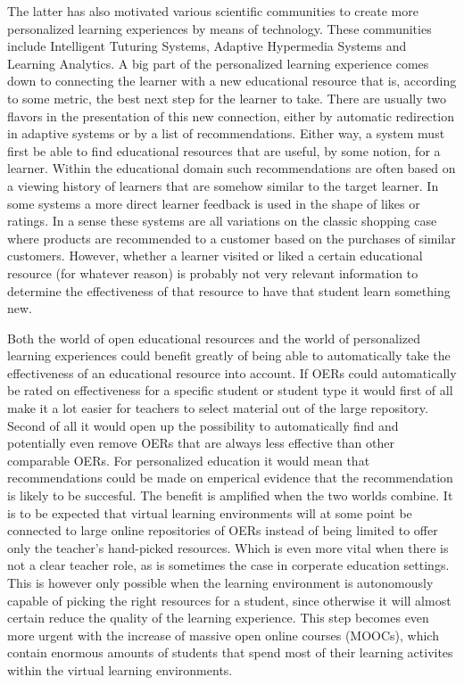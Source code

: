 The latter has also motivated various scientific communities to create more personalized learning experiences by means of technology. These communities include Intelligent Tuturing Systems, Adaptive Hypermedia Systems and Learning Analytics. A big part of the personalized learning experience comes down to connecting the learner with a new educational resource that is, according to some metric, the best next step for the learner to take. There are usually two flavors in the presentation of this new connection, either by automatic redirection in adaptive systems or by a list of recommendations. Either way, a system must first be able to find educational resources that are useful, by some notion, for a learner. Within the educational domain such recommendations are often based on a viewing history of learners that are somehow similar to the target learner. In some systems a more direct learner feedback is used in the shape of likes or ratings. In a sense these systems are all variations on the classic shopping case where products are recommended to a customer based on the purchases of similar customers. However, whether a learner visited or liked a certain educational resource (for whatever reason) is probably not very relevant information to determine the effectiveness of that resource to have that student learn something new.

Both the world of open educational resources and the world of personalized learning experiences could benefit greatly of being able to automatically take the effectiveness of an educational resource into account. If OERs could automatically be rated on effectiveness for a specific student or student type it would first of all make it a lot easier for teachers to select material out of the large repository. Second of all it would open up the possibility to automatically find and potentially even remove OERs that are always less effective than other comparable OERs. For personalized education it would mean that recommendations could be made on emperical evidence that the recommendation is likely to be succesful. The benefit is amplified when the two worlds combine. It is to be expected that virtual learning environments will at some point be connected to large online repositories of OERs instead of being limited to offer only the teacher’s hand-picked resources. Which is even more vital when there is not a clear teacher role, as is sometimes the case in corperate education settings. This is however only possible when the learning environment is autonomously capable of picking the right resources for a student, since otherwise it will almost certain reduce the quality of the learning experience. This step becomes even more urgent with the increase of massive open online courses (MOOCs), which contain enormous amounts of students that spend most of their learning activites within the virtual learning environments.
